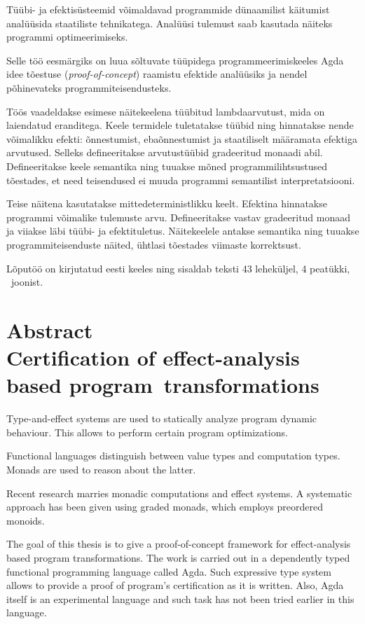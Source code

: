\documentclass[a4paper,12pt]{article}
\begin{document}
Tüübi- ja efektisüsteemid võimaldavad programmide dünaamilist käitumist analüüsida staatiliste tehnikatega. Analüüsi tulemust saab kasutada näiteks programmi optimeerimiseks.

Selle töö eesmärgiks on luua sõltuvate tüüpidega programmeerimiskeeles Agda idee tõestuse (\emph{proof-of-concept}) raamistu efektide analüüsiks ja nendel põhinevateks programmiteisendusteks.

Töös vaadeldakse esimese näitekeelena tüübitud lambdaarvutust, mida on laiendatud eranditega.
Keele termidele tuletatakse tüübid ning hinnatakse nende võimalikku efekti: õnnestumist, ebaõnnestumist ja staatiliselt määramata efektiga arvutused.
Selleks defineeritakse arvutustüübid gradeeritud monaadi abil.
Defineeritakse keele semantika ning tuuakse mõned programmilihtsustused tõestades, et need teisendused ei muuda programmi semantilist interpretatsiooni.

Teise näitena kasutatakse mittedeterministlikku keelt.
Efektina hinnatakse programmi võimalike tulemuste arvu.
Defineeritakse vastav gradeeritud monaad ja viiakse läbi tüübi- ja efektituletus.
Näitekeelele antakse semantika ning tuuakse programmiteisenduste näited, ühtlasi tõestades viimaste korrektsust.


Lõputöö on kirjutatud eesti keeles ning sisaldab teksti 43 leheküljel, 4 peatükki, \totalfigures~joonist.
\clearpage\vspace*{0pt}

\section*{\centering Abstract\\
Certification of effect-analysis based program~transformations}

Type-and-effect systems are used to statically analyze program dynamic behaviour.
This allows to perform certain program optimizations.

Functional languages distinguish between value types and computation types.
Monads are used to reason about the latter.

Recent research marries monadic computations and effect systems.
A systematic approach has been given using graded monads, which employs preordered monoids.

The goal of this thesis is to give a proof-of-concept framework for effect-analysis based program transformations.
The work is carried out in a dependently typed functional programming language called Agda.
Such expressive type system allows to provide a proof of program's certification as it is written.
Also, Agda itself is an experimental language and such task has not been tried earlier in this language.
\end{document}
